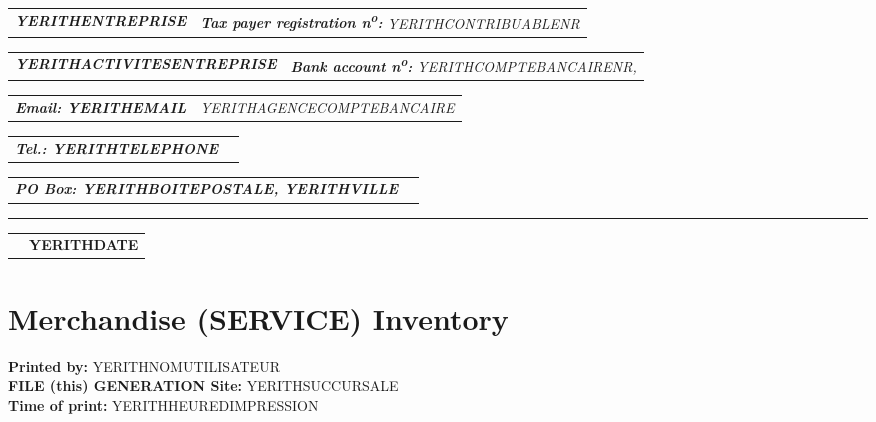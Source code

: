 \documentclass[16pt,YERITHPAPERSPEC]{article} %
\makeatletter
\newcommand{\headerrow}[2]
{\begin{tabular*}{\linewidth}{l@{\extracolsep{\fill}}r}
	#1 &
	#2 \\
\end{tabular*}}
\newcommand{\emphbold}[1]{\textbf{\emph{#1}}\xspace}
\makeatother
\begin{document}
\bigskip

\headerrow
	{\emphbold{YERITHENTREPRISE}}
	{\emph{\textbf{Tax payer registration n\textsuperscript{o}:} YERITHCONTRIBUABLENR}}
\headerrow
	{\emphbold{YERITHACTIVITESENTREPRISE}}
	{\emph{\textbf{Bank account n\textsuperscript{o}:} YERITHCOMPTEBANCAIRENR,}}
\headerrow
	{\emphbold{Email: YERITHEMAIL}}
	{\emph{YERITHAGENCECOMPTEBANCAIRE}}
\headerrow
	{\emphbold{Tel.: YERITHTELEPHONE}}
	{}
\headerrow
	{\emphbold{PO Box: YERITHBOITEPOSTALE, YERITHVILLE}}
	{}
	
\hrule

\headerrow
	{}
	{\textbf{YERITHDATE}}

\section*{Merchandise (SERVICE) Inventory}

\textbf{Printed by:} YERITHNOMUTILISATEUR\\
\textbf{FILE (this) GENERATION Site:} YERITHSUCCURSALE\\
\textbf{Time of print:} YERITHHEUREDIMPRESSION

\vspace{0.3cm}
\end{document}
